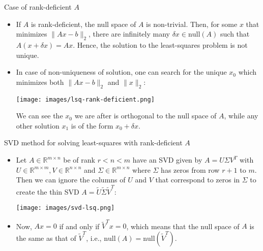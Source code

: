 \documentclass[t,usepdftitle=false]{beamer}
\begin{document}
\begin{frame}{Case of rank-deficient $A$}
\begin{itemize}
\item If $A$ is rank-deficient, the null space of $A$ is non-trivial.
Then, for some $x$ that minimizes $\|Ax-b\|_2$, there are infinitely many $\delta x\in\mathrm{null}(A)$ such that $A(x+\delta x)=Ax$.
Hence, the solution to the least-squares problem is not unique.
\item In case of non-uniqueness of solution, one can search for the unique $x_0$ which minimizes both $\|Ax-b\|_2$ and $\|x\|_2$:\vspace{.3cm}
\begin{center}
\texttt{[image: images/lsq-rank-deficient.png]}
\end{center}
We can see the $x_0$ we are after is orthogonal to the null space of $A$, while any other solution $x_1$ is of the form $x_0+\delta x$.
\end{itemize}
\end{frame}

\begin{frame}{SVD method for solving least-squares with rank-deficient $A$}
\begin{itemize}
\item Let $A\in\mathbb{R}^{m\times n}$ be of rank $r<n<m$ have an SVD given by $A=U\Sigma V^T$ with $U\in\mathbb{R}^{m\times m},V\in\mathbb{R}^{n\times n}$ and $\Sigma\in\mathbb{R}^{m\times n}$ where $\Sigma$ has zeros from row $r+1$ to $m$.\vspace{.1cm}\\
Then we can ignore the columns of $U$ and $V$ that correspond to zeros in $\Sigma$ to create the thin SVD $A=\widetilde{U}\widetilde{\Sigma}\widetilde{V}^T$:\vspace{.2cm}
\begin{center}
\texttt{[image: images/svd-lsq.png]}
\end{center}\vspace{.2cm}
\item Now, $Ax=0$ if and only if $\widetilde{V}^Tx=0$, which means that the null space of $A$ is the same as that of $\widetilde{V}^T$, i.e., $\mathrm{null}(A)=\mathrm{null}(\widetilde{V}^T)$.
\end{itemize}
\end{frame}
\end{document}
